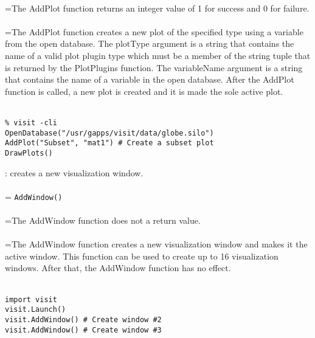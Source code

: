 \documentclass[10pt,a4paper]{report}
\begin{document}
 \\ 
\hangindent=\parindent The AddPlot function returns an integer value of 1 for success and 0 for failure. \\[-3mm] 

 \\ 
\hangindent=\parindent The AddPlot function creates a new plot of the specified type using a variable from the open database. The plotType argument is a string that contains the name of a valid plot plugin type which must be a member of the string tuple that is returned by the PlotPlugins function. The variableName argument is a string that contains the name of a variable in the open database. After the AddPlot function is called, a new plot is created and it is made the sole active plot. \\[-3mm] 

\\[-6mm]
\begin{verbatim}% visit -cli
OpenDatabase("/usr/gapps/visit/data/globe.silo")
AddPlot("Subset", "mat1") # Create a subset plot
DrawPlots()
\end{verbatim}
\newpage


{}
: creates a new visualization window.\\[-3mm]

 \\ 
\hangindent=\parindent 
\verb!AddWindow()!\\ [-3mm]

 \\ 
\hangindent=\parindent The AddWindow function does not a return value. \\[-3mm] 

 \\ 
\hangindent=\parindent The AddWindow function creates a new visualization window and makes it the active window. This function can be used to create up to 16 visualization windows. After that, the AddWindow function has no effect. \\[-3mm] 

\\[-6mm]
\begin{verbatim}import visit
visit.Launch()
visit.AddWindow() # Create window #2
visit.AddWindow() # Create window #3
\end{verbatim}
\newpage
\end{document}
